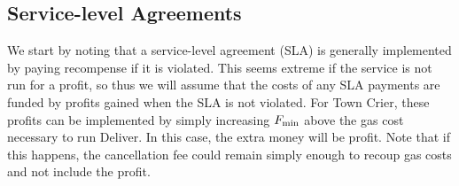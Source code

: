 %
%
%
%

\subsection{Service-level Agreements}

We start by noting that a service-level agreement (SLA) is generally implemented by paying recompense if it is violated.
This seems extreme if the service is not run for a profit, so thus we will assume that the costs of any SLA payments are funded by profits gained when the SLA is not violated.
For Town Crier, these profits can be implemented by simply increasing $F_{\rm min}$ above the gas cost necessary to run Deliver.
In this case, the extra money will be profit.
Note that if this happens, the cancellation fee could remain simply enough to recoup gas costs and not include the profit.


